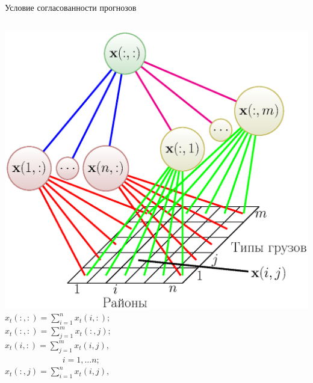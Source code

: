 \documentclass{beamer}
\begin{document}
\begin{frame}{Условие согласованности прогнозов}
	\begin{columns}[c]
		\includegraphics[width=1.1\textwidth, viewport= 4.5cm 10cm 20.2cm 25.3cm, clip]{Hierarchy3Levels.eps}
        {\small
        \textcolor[rgb]{0.00,0.00,1.00}{$x_t(:, :) = \sum\limits_{i = 1}^n x_t(i, :);$} \\ %

        \textcolor[rgb]{1.00,0.00,1.00}{$x_t(:, :) = \sum\limits_{j = 1}^m x_t(:, j);$} \\%

        \textcolor[rgb]{1.00,0.00,0.00}{$x_t(i, :) = \sum\limits_{j = 1}^m x_t(i, j),$} \\

        ~~~~~~~~~~~~~ {\tiny\textcolor[rgb]{1.00,0.00,0.00}{$i = 1, \ldots n;$}}  \\ %

        \textcolor[rgb]{0.00,0.59,0.00}{$x_t(:, j) = \sum\limits_{i = 1}^n x_t(i, j),$} \\

}
\end{columns}
\end{frame}
\end{document}
